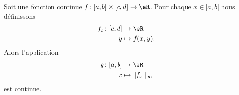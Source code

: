 \begin{lemma}            \label{LEMooIVAKooUiEENr}
	Soit une fonction continue \( f\colon \mathopen[ a , b \mathclose]\times \mathopen[ c , d \mathclose]\to \eR\). Pour chaque \( x\in \mathopen[ a , b \mathclose]\) nous définissons
	\begin{equation}
		\begin{aligned}
			f_x\colon \mathopen[ c , d \mathclose] & \to \eR         \\
			y                                      & \mapsto f(x,y).
		\end{aligned}
	\end{equation}
	Alors l'application
	\begin{equation}
		\begin{aligned}
			g\colon \mathopen[ a , b \mathclose] & \to \eR                    \\
			x                                    & \mapsto \| f_x \|_{\infty}
		\end{aligned}
	\end{equation}
	est continue.
\end{lemma}

